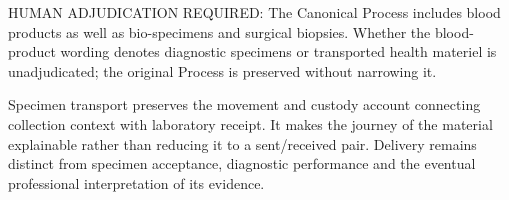HUMAN ADJUDICATION REQUIRED: The Canonical Process includes blood products as well as bio-specimens and surgical biopsies. Whether the blood-product wording denotes diagnostic specimens or transported health materiel is unadjudicated; the original Process is preserved without narrowing it.



Specimen transport preserves the movement and custody account connecting collection context with laboratory receipt. It makes the journey of the material explainable rather than reducing it to a sent/\allowbreak{}received pair. Delivery remains distinct from specimen acceptance, diagnostic performance and the eventual professional interpretation of its evidence.



